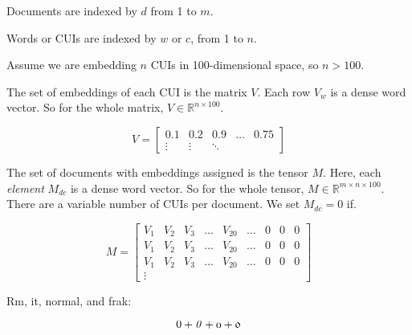 \documentclass{article}
\begin{document}
Documents are indexed by $d$ from 1 to $m$.

Words or CUIs are indexed by $w$ or $c$, from 1 to $n$.

Assume we are embedding $n$ CUIs in 100-dimensional space, so $n > 100$.

The set of embeddings of each CUI is the matrix $V$. Each row $V_w$ is
a dense word vector. So for the whole matrix, $V \in \mathbb{R}^{n
  \times 100}$.

\begin{equation}
  V = \left[
      \begin{array}{ccccc}
        0.1 & 0.2 & 0.9 & \ldots & 0.75 \\
        \vdots & \vdots & \ddots
      \end{array} \right]
\end{equation}

The set of documents with embeddings assigned is the tensor $M$. Here,
each \emph{element} $M_{dc}$ is a dense word vector. So for the whole
tensor, $M \in \mathbb{R}^{m \times n \times 100}$. There are a
variable number of CUIs per document. We set $M_{dc} = 0$ if.

\begin{equation}
  M = \left[
      \begin{array}{ccccccccc}
        V_1 & V_2 & V_3 & \ldots & V_{20} & \ldots & 0 & 0 & 0 \\
        V_1 & V_2 & V_3 & \ldots & V_{20} & \ldots & 0 & 0 & 0 \\
        V_1 & V_2 & V_3 & \ldots & V_{20} & \ldots & 0 & 0 & 0 \\
        \vdots
      \end{array} \right]
\end{equation}

Rm, it, normal, and frak:

\begin{equation}
  \mathrm{0} + \mathit{0} + \mathnormal{0} + \mathfrak{0}
\end{equation}
\end{document}

